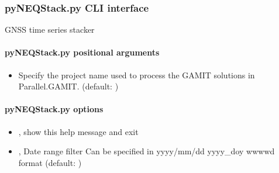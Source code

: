 \documentclass[letterpaper,10pt,english]{sphinxmanual}
\begin{document}
\subsubsection{pyNEQStack.py \sphinxhyphen{} CLI interface}
\label{\detokenize{stacker:pyNEQStack.py---CLI-interface}}
\sphinxAtStartPar
GNSS time series stacker

\begin{sphinxVerbatim}[commandchars=\\\{\}]
 \PYG{p}{[}\PYG{p}{]} \PYG{p}{[}  \PYG{p}{[} \PYG{p}{]}\PYG{p}{]}  
\end{sphinxVerbatim}


\paragraph{pyNEQStack.py positional arguments}
\label{\detokenize{stacker:pyNEQStack.py-positional-arguments}}\begin{itemize}
\item {} 
\sphinxAtStartPar
{\hyperref[\detokenize{stacker:pyNEQStack.py-_project-name_}]{}} \sphinxhyphen{} Specify the project name used to process the GAMIT solutions in Parallel.GAMIT. (default: )

\end{itemize}


\paragraph{pyNEQStack.py options}
\label{\detokenize{stacker:pyNEQStack.py-options}}\begin{itemize}
\item {} 
\sphinxAtStartPar
{\hyperref[\detokenize{stacker:pyNEQStack.py--h}]{}}, {\hyperref[\detokenize{stacker:pyNEQStack.py---help}]{}} \sphinxhyphen{} show this help message and exit

\item {} 
\sphinxAtStartPar
{\hyperref[\detokenize{stacker:pyNEQStack.py--d}]{}} , {\hyperref[\detokenize{stacker:pyNEQStack.py---date_filter}]{}}  \sphinxhyphen{} Date range filter Can be specified in yyyy/mm/dd yyyy\_doy  wwww\sphinxhyphen{}d format (default: )

\end{itemize}
\end{document}
